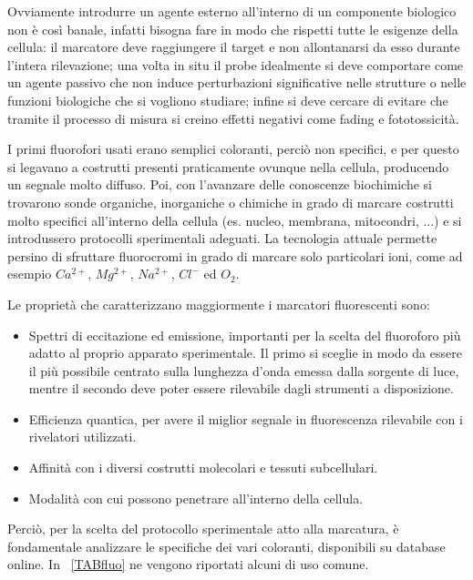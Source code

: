 Ovviamente introdurre un agente esterno all'interno di un componente biologico non è così banale, infatti bisogna fare in modo che rispetti tutte le esigenze della cellula: il marcatore deve raggiungere il target e non allontanarsi da esso durante l'intera rilevazione; una volta in situ il probe idealmente si deve comportare come un agente passivo che non induce perturbazioni significative nelle strutture o nelle funzioni biologiche che si vogliono studiare; infine si deve cercare di evitare che tramite il processo di misura si creino effetti negativi come fading e fototossicità.

I primi fluorofori usati erano semplici coloranti, perciò non specifici, e per questo si legavano a costrutti presenti praticamente ovunque nella cellula, producendo un segnale molto diffuso. 
Poi, con l'avanzare delle conoscenze biochimiche si trovarono sonde organiche, inorganiche o chimiche in grado di marcare costrutti molto specifici all'interno della cellula (es. nucleo, membrana, mitocondri, ...) e si introdussero protocolli sperimentali adeguati. 
La tecnologia attuale permette persino di sfruttare fluorocromi in grado di marcare solo particolari ioni, come ad esempio $Ca^{2+}$, $Mg^{2+}$, $Na^{2+}$, $Cl^-$ ed $O_2$.

Le proprietà che caratterizzano maggiormente i marcatori fluorescenti sono:
\begin{itemize}
\item Spettri di eccitazione ed emissione, importanti per la scelta del fluoroforo più adatto al proprio apparato sperimentale. 
Il primo si sceglie in modo da essere il più possibile centrato sulla lunghezza d'onda emessa dalla sorgente di luce, mentre il secondo deve poter essere rilevabile dagli strumenti a disposizione. 
\item Efficienza quantica, per avere il miglior segnale in fluorescenza rilevabile con i rivelatori utilizzati. 
\item Affinità con i diversi costrutti molecolari e tessuti subcellulari.
\item Modalità con cui possono penetrare all'interno della cellula.
\end{itemize}
Perciò, per la scelta del protocollo sperimentale atto alla marcatura, è fondamentale analizzare le specifiche dei vari coloranti, disponibili su database online. 
In \tablename~\ref{TABfluo} ne vengono riportati alcuni di uso comune.

